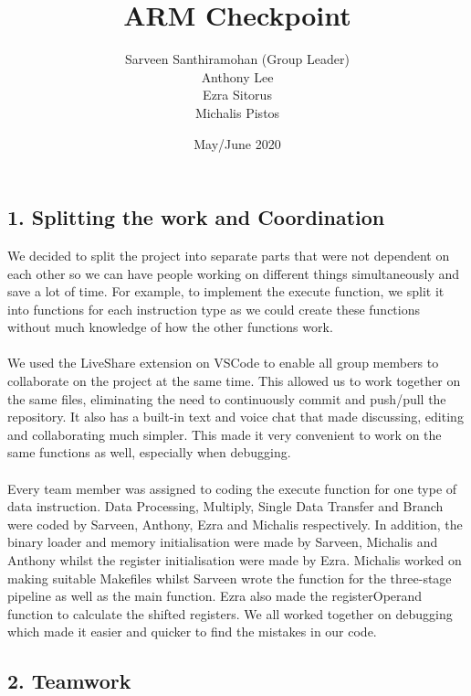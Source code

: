 \documentclass[a4paper]{article}
\title{ARM Checkpoint}
\author{Sarveen Santhiramohan (Group Leader) \\ Anthony Lee\\ Ezra Sitorus\\ Michalis Pistos}
\date{May/June 2020}
\begin{document}
\maketitle

\subsection*{1. Splitting the work and Coordination}
 We decided to split the project into separate parts that were not dependent on each other so we can have people
 working on different things simultaneously and save a lot of time. For example, to implement the execute function,
 we split it into functions for each instruction type as we could create these functions without much knowledge of how the other
 functions work. 
\\ \\
 We used the LiveShare extension on VSCode to enable all group members to collaborate on the 
 project at the same time. This allowed us to work together on the same files, eliminating the need
 to continuously commit and push/pull the repository. It also has a built-in text and voice chat that made 
 discussing, editing and collaborating much simpler. This made it very convenient to work on the same functions
 as well, especially when debugging. 
\\ \\
 Every team member was assigned to coding the execute function for one type of data instruction. Data Processing,
 Multiply, Single Data Transfer and Branch were coded by Sarveen, Anthony, Ezra and Michalis respectively.
 In addition, the binary loader and memory initialisation were made by Sarveen, Michalis and Anthony whilst 
 the register initialisation were made by Ezra. Michalis worked on making suitable Makefiles whilst Sarveen wrote the 
 function for the three-stage pipeline as well as the main function. Ezra also made the registerOperand function 
 to calculate the shifted registers. We all worked together on debugging which made it easier and quicker 
 to find the mistakes in our code.

\bigskip
\subsection*{2. Teamwork}
\end{document}
